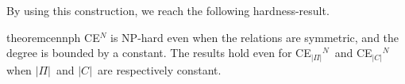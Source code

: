 \documentclass[a4paper,fleqn]{cas-sc}
\newcommand{\partition}{\ensuremath{\Pi}\xspace}
\newcommand{\coalition}{\ensuremath{C}\xspace}
\newcommand{\CEBounded}{CE$_{\maxNumberOfCoalitions}$\xspace}
\newcommand{\CEBoundedCoal}{CE$_{\maxCoalitionSize}$\xspace}
\newcommand{\neut}[1]{#1\unskip$^{N}$}
\newcommand{\maxCoalitionSize}{\ensuremath{|\coalition|}\xspace}
\newcommand{\maxNumberOfCoalitions}{\ensuremath{|\partition|}\xspace}
\newcommand{\appsymb}{$\star$}
\begin{document}
By using this construction, we reach the following hardness-result.

\begin{restatable}[\appsymb]{theorem}{cennph}
\neut{CE} is NP-hard even when the relations are symmetric, and the degree is bounded by a constant. The results hold even for \neut{\CEBounded}\ and \neut{\CEBoundedCoal} when \maxNumberOfCoalitions\ and \maxCoalitionSize\ are respectively constant.\label{cen:nph}\end{restatable}

\newcommand{\tvarn}[1]{\ensuremath{y_{#1}}}
\newcommand{\fvarn}[1]{\ensuremath{\bar{y}_{#1}}}
\newcommand{\lvarn}[1]{\ensuremath{\ell_{#1}}}
\newcommand{\nlvarn}[1]{\ensuremath{\bar{\ell}_{#1}}}
\newcommand{\Ix}[1]{\ensuremath{I^{#1}_{x}}}
\newcommand{\Ic}[1]{\ensuremath{I^{#1}_{C}}}
\newcommand{\rew}[2]{\ensuremath{r^{#2}_{#1}}}
\newcommand{\Rew}[1]{\ensuremath{R_{#1}}}
\newcommand{\Ixx}[2]{\ensuremath{\Ix{#1}(#2)}}
\newcommand{\Icx}[2]{\ensuremath{\Ic{#1}(#2)}}
\end{document}

